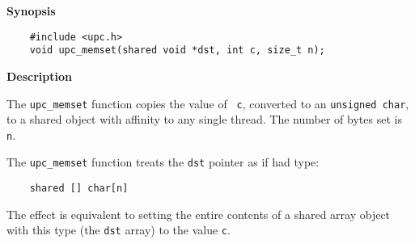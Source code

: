 {\bf Synopsis}

\npf\vspace{-2.5em}
\begin{verbatim}
    #include <upc.h> 
    void upc_memset(shared void *dst, int c, size_t n); 
\end{verbatim}

{\bf Description}

\np The {\tt upc\_memset} function copies the value of {\tt
   c}, converted to an {\tt unsigned char}, to a shared object with affinity
   to any single thread.  The number of bytes set is {\tt n}.

\np The {\tt upc\_memset} function treats the {\tt dst}
   pointer as if had type:

\begin{verbatim}
    shared [] char[n] 
\end{verbatim}

   The effect is equivalent to setting the entire contents of a shared
   array object with this type (the {\tt dst} array) to the value {\tt c}.


